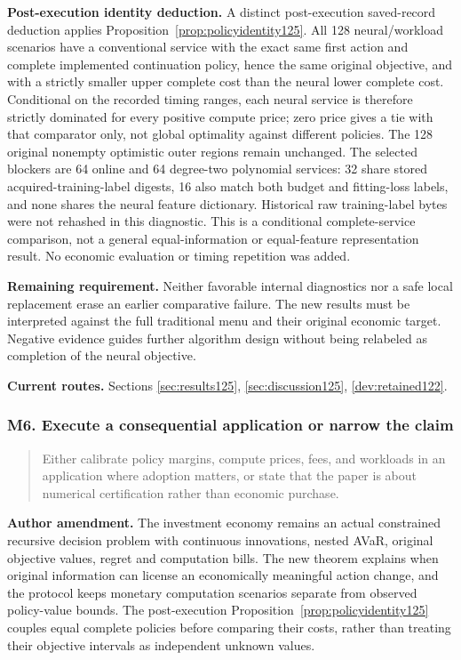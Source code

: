 \noindent\textbf{Post-execution identity deduction.} A distinct post-execution saved-record deduction applies Proposition~\ref{prop:policyidentity125}. All 128 neural/workload scenarios have a conventional service with the exact same first action and complete implemented continuation policy, hence the same original objective, and with a strictly smaller upper complete cost than the neural lower complete cost. Conditional on the recorded timing ranges, each neural service is therefore strictly dominated for every positive compute price; zero price gives a tie with that comparator only, not global optimality against different policies. The 128 original nonempty optimistic outer regions remain unchanged. The selected blockers are 64 online and 64 degree-two polynomial services: 32 share stored acquired-training-label digests, 16 also match both budget and fitting-loss labels, and none shares the neural feature dictionary. Historical raw training-label bytes were not rehashed in this diagnostic. This is a conditional complete-service comparison, not a general equal-information or equal-feature representation result. No economic evaluation or timing repetition was added.

\noindent\textbf{Remaining requirement.} Neither favorable internal diagnostics nor a safe local replacement erase an earlier comparative failure. The new results must be interpreted against the full traditional menu and their original economic target. Negative evidence guides further algorithm design without being relabeled as completion of the neural objective.

\noindent\textbf{Current routes.} Sections \ref{sec:results125}, \ref{sec:discussion125}, \ref{dev:retained122}.

\subsubsection{M6. Execute a consequential application or narrow the claim}

\begin{quote}\small
Either calibrate policy margins, compute prices, fees, and workloads in an application where adoption matters, or state that the paper is about numerical certification rather than economic purchase.
\end{quote}

\noindent\textbf{Author amendment.} The investment economy remains an actual constrained recursive decision problem with continuous innovations, nested AVaR, original objective values, regret and computation bills. The new theorem explains when original information can license an economically meaningful action change, and the protocol keeps monetary computation scenarios separate from observed policy-value bounds. The post-execution Proposition~\ref{prop:policyidentity125} couples equal complete policies before comparing their costs, rather than treating their objective intervals as independent unknown values.

